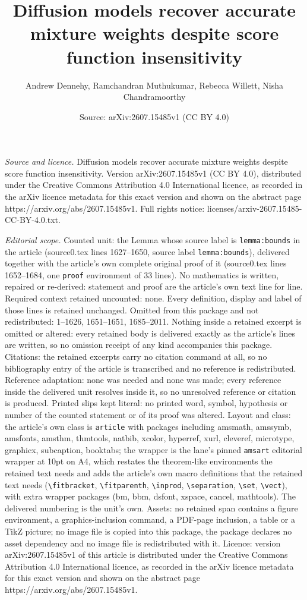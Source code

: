 \documentclass[10pt,a4paper]{amsart}
\title[Diffusion models recover accurate mixture weights despite sc]{Diffusion models recover accurate mixture weights despite score function insensitivity}
\author{Andrew Dennehy, Ramchandran Muthukumar, Rebecca Willett, Nisha Chandramoorthy}
\date{Source: arXiv:2607.15485v1 (CC BY 4.0)}
\begin{document}
\maketitle

\noindent\emph{Source and licence.} Diffusion models recover accurate mixture weights despite score function insensitivity. Version arXiv:2607.15485v1 (CC BY 4.0), distributed under the Creative Commons Attribution 4.0 International licence, as recorded in the arXiv licence metadata for this exact version and shown on the abstract page https://arxiv.org/abs/2607.15485v1. Full rights notice: licenses/arxiv-2607.15485-CC-BY-4.0.txt.\par\smallskip

\noindent\textit{Editorial scope.} Counted unit: the Lemma whose source label is \texttt{lemma:bounds} in the article (source0.tex lines 1627--1650, source label \texttt{lemma:bounds}), delivered together with the article's own complete original proof of it (source0.tex lines 1652--1684, one \texttt{proof} environment of 33 lines). No mathematics is written, repaired or re-derived: statement and proof are the article's own text line for line. Required context retained uncounted: none. Every definition, display and label of those lines is retained unchanged. Omitted from this package and not redistributed: 1--1626, 1651--1651, 1685--2011. Nothing inside a retained excerpt is omitted or altered: every retained body is delivered exactly as the article's lines are written, so no omission receipt of any kind accompanies this package. Citations: the retained excerpts carry no citation command at all, so no bibliography entry of the article is transcribed and no reference is redistributed. Reference adaptation: none was needed and none was made; every reference inside the delivered unit resolves inside it, so no unresolved reference or citation is produced. Printed slips kept literal: no printed word, symbol, hypothesis or number of the counted statement or of its proof was altered. Layout and class: the article's own class is \texttt{article} with packages including amsmath, amssymb, amsfonts, amsthm, thmtools, natbib, xcolor, hyperref, xurl, cleveref, microtype, graphicx, subcaption, booktabs; the wrapper is the lane's pinned \texttt{amsart} editorial wrapper at 10pt on A4, which restates the theorem-like environments the retained text needs and adds the article's own macro definitions that the retained text needs (\texttt{\textbackslash fitbracket}, \texttt{\textbackslash fitparenth}, \texttt{\textbackslash inprod}, \texttt{\textbackslash separation}, \texttt{\textbackslash set}, \texttt{\textbackslash vect}), with extra wrapper packages (bm, bbm, dsfont, xspace, cancel, mathtools). The delivered numbering is the unit's own. Assets: no retained span contains a figure environment, a graphics-inclusion command, a PDF-page inclusion, a table or a TikZ picture; no image file is copied into this package, the package declares no asset dependency and no image file is redistributed with it. Licence: version arXiv:2607.15485v1 of this article is distributed under the Creative Commons Attribution 4.0 International licence, as recorded in the arXiv licence metadata for this exact version and shown on the abstract page https://arxiv.org/abs/2607.15485v1. 
\end{document}

